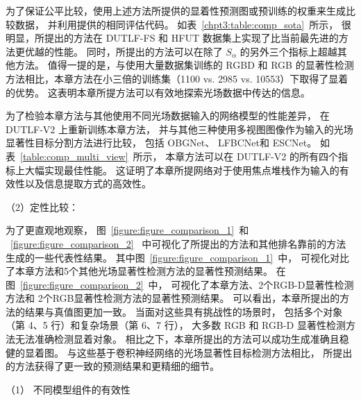 为了保证公平比较，使用上述方法所提供的显着性预测图或预训练的权重来生成比较数据，
并利用提供的相同评估代码。
如表~\ref{chpt3:table:comp_sota}~所示，
很明显，所提出的方法在 DUTLF-FS 和 HFUT 数据集上实现了比当前最先进的方法更优越的性能。 同时，所提出的方法可以在除了 $ S_{\alpha} $ 的另外三个指标上超越其他方法。 值得一提的是，与使用大量数据集训练的 RGBD 和 RGB 的显著性检测方法相比，本章方法在小三倍的训练集（1100 vs. 2985 vs. 10553）下取得了显着的优势。 
这表明本章所提方法可以有效地探索光场数据中传达的信息。 



为了检验本章方法与其他使用不同光场数据输入的网络模型的性能差异，
在 DUTLF-V2 上重新训练本章方法，
并与其他三种使用多视图图像作为输入的光场显著性目标分割方法进行比较，
包括 OBGNet、
LFBCNet和
ESCNet。 
如表~\ref{table:comp_multi_view}~所示，
本章方法可以在 DUTLF-V2 的所有四个指标上大幅实现最佳性能。 
这证明了本章所提网络对于使用焦点堆栈作为输入的有效性以及信息提取方式的高效性。 






（2）定性比较：


为了更直观地观察，
图~\ref{figure:figure_comparison_1}~和
~\ref{figure:figure_comparison_2}~
中可视化了所提出的方法和其他排名靠前的方法生成的一些代表性结果。
其中图~\ref{figure:figure_comparison_1}~中，
可视化对比了本章方法和5个其他光场显著性检测方法的显著性预测结果。
在图~\ref{figure:figure_comparison_2}~中，
可视化了本章方法、2个RGB-D显著性检测方法和
2个RGB显著性检测方法的显著性预测结果。
可以看出，本章所提出的方法的结果与真值图更加一致。 
当面对这些具有挑战性的场景时，
包括多个对象（第 4、5 行）和复杂场景（第 6、7 行），
大多数 RGB 和 RGB-D 显著性检测方法无法准确检测显着对象。
相比之下，本章所提出的方法可以成功生成准确且稳健的显着图。
与这些基于卷积神经网络的光场显著性目标检测方法相比，
所提出的方法获得了更一致的预测结果和更精细的细节。










（1）
不同模型组件的有效性



